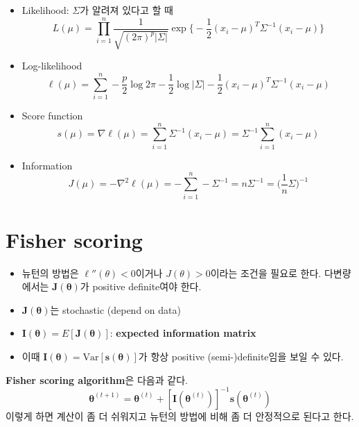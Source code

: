\documentclass[
  letterpaper,
  DIV=11,
  numbers=noendperiod]{scrreprt}
\theoremstyle{definition}
\theoremstyle{definition}
\theoremstyle{remark}
\begin{document}
\begin{itemize}
\item
  Likelihood: \(\Sigma\)가 알려져 있다고 할 때 \[
  L(\mu) = \prod_{i=1}^n \frac{1}{\sqrt{(2\pi)^p |\Sigma|}}\exp \Big\{ - \frac{1}{2}(x_i - \mu)^T \Sigma^{-1}(x_i - \mu) \Big\}
  \]
\item
  Log-likelihood \[
  \ell (\mu) = \sum_{i=1}^n -\frac{p}{2}\log 2\pi - \frac{1}{2}\log |\Sigma | - \frac{1}{2} (x_i - \mu)^T \Sigma^{-1}(x_i - \mu)
  \]
\item
  Score function \[
  s(\mu) = \nabla \ell (\mu) = \sum_{i=1}^n \Sigma^{-1} (x_i - \mu) = \Sigma^{-1}\sum_{i=1}^n (x_i - \mu)
  \]
\item
  Information \[
  J(\mu) = - \nabla^2 \ell (\mu) = - \sum_{i=1}^n -\Sigma^{-1} = n \Sigma^{-1} = \Big( \frac{1}{n}\Sigma \Big)^{-1}
  \]
\end{itemize}

\section{Fisher scoring}\label{fisher-scoring}

\begin{itemize}
\item
  뉴턴의 방법은 \(\ell'' (\theta) <0\)이거나 \(J(\theta) >0\)이라는
  조건을 필요로 한다. 다변량에서는 \(\pmb{J}(\pmb{\theta})\)가 positive
  definite여야 한다.
\item
  \(\pmb{J}(\pmb{\theta})\)는 stochastic (depend on data)
\item
  \(\pmb{I}(\pmb{\theta}) = E[ \pmb{J}(\pmb{\theta})]\):
  \textbf{expected information matrix}
\item
  이때 \(\pmb{I}(\pmb{\theta}) = \text{Var}[\pmb{s}(\pmb{\theta})]\)가
  항상 positive (semi-)definite임을 보일 수 있다.
\end{itemize}

\textbf{Fisher scoring algorithm}은 다음과 같다. \[
\pmb{\theta}^{(t+1)} = \pmb{\theta}^{(t)} + [\pmb{I}(\pmb{\theta}^{(t)})]^{-1}\pmb{s}(\pmb{\theta}^{(t)})
\] 이렇게 하면 계산이 좀 더 쉬워지고 뉴턴의 방법에 비해 좀 더 안정적으로
된다고 한다.
\end{document}
